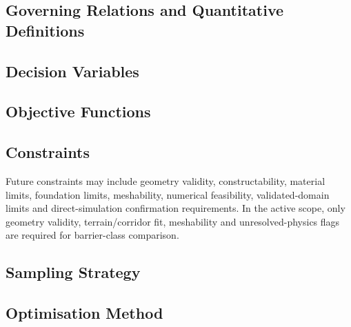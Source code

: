 \subsection{Governing Relations and Quantitative Definitions}
\label{sec:res-opt-cst-governing-relations}

%

\subsection{Decision Variables}
\label{sec:res-opt-cst-decision-variables}


\subsection{Objective Functions}
\label{sec:res-opt-cst-objective-functions}


\subsection{Constraints}
\label{sec:res-opt-cst-constraints}

Future constraints may include geometry validity, constructability,
material limits, foundation limits, meshability, numerical feasibility,
validated-domain limits and direct-simulation confirmation
requirements. In the active scope, only geometry validity,
terrain/corridor fit, meshability and unresolved-physics flags are
required for barrier-class comparison.

\subsection{Sampling Strategy}
\label{sec:res-opt-cst-sampling-strategy}


\subsection{Optimisation Method}
\label{sec:res-opt-cst-optimisation-method}

